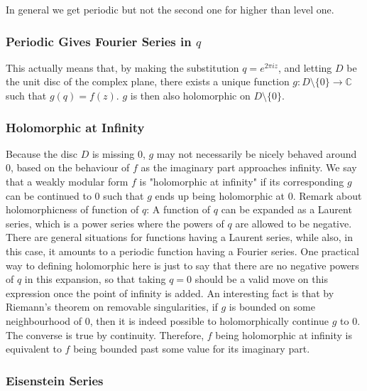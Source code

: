 \documentclass{article}
\theoremstyle{definition}
\theoremstyle{definition}
\theoremstyle{definition}
\begin{document}
 
 In general we get periodic but not the second one for higher than level one.

 \subsubsection{Periodic Gives Fourier Series in $q$}
 This actually means that, by making the substitution $q=e^{2\pi iz}$, and letting $D$ be the unit disc of the complex plane, there exists a unique function $g:D\setminus\{0\}\rightarrow\mathbb{C}$ such that $g(q)=f(z)$. $g$ is then also holomorphic on $D\setminus\{0\}$.

\subsubsection{Holomorphic at Infinity}

Because the disc $D$ is missing $0$, $g$ may not necessarily be nicely behaved around $0$, based on the behaviour of $f$ as the imaginary part approaches infinity. We say that a weakly modular form $f$ is "holomorphic at infinity" if its corresponding $g$ can be continued to $0$ such that $g$ ends up being holomorphic at $0$.
\newline\newline
Remark about holomorphicness of function of $q$: A function of $q$ can be expanded as a Laurent series, which is a power series where the powers of $q$ are allowed to be negative. There are general situations for functions having a Laurent series, while also, in this case, it amounts to a periodic function having a Fourier series. One practical way to defining holomorphic here is just to say that there are no negative powers of $q$ in this expansion, so that taking $q=0$ should be a valid move on this expression once the point of infinity is added.
\newline\newline
An interesting fact is that by Riemann's theorem on removable singularities, if $g$ is bounded on some neighbourhood of $0$, then it is indeed possible to holomorphically continue $g$ to $0$. The converse is true by continuity. Therefore, $f$ being holomorphic at infinity is equivalent to $f$ being bounded past some value for its imaginary part.
    


\subsubsection{Eisenstein Series}
\end{document}
